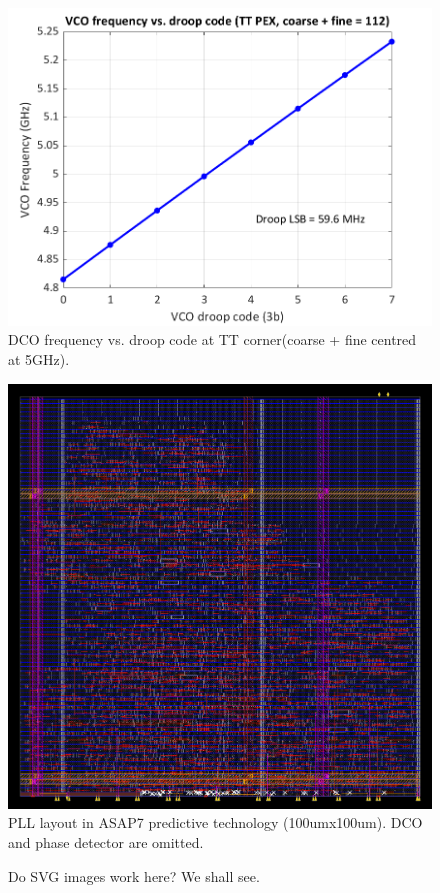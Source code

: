 \documentclass[twoside,9pt,journal,letterpage]{IEEEtran}
\begin{document}
\begin{figure}[h]
	\centering
	\includegraphics[width=0.7\columnwidth]{fig_dco_droopctrl}
	\caption{DCO frequency vs. droop code at TT corner(coarse + fine centred at 5GHz).}
	\label{fig:dco_droopctrl}
\end{figure}

\begin{figure}[h]
	\centering
	\includegraphics[width=0.7\columnwidth]{pnr3.png}
	\caption{PLL layout in ASAP7 predictive technology (100umx100um). DCO and phase detector are omitted.}
	\label{fig:layout}
\end{figure}

\begin{figure}[h]
	\centering
	
	\caption{Do SVG images work here? We shall see.}
	\label{fig:svg}
\end{figure}
\end{document}
